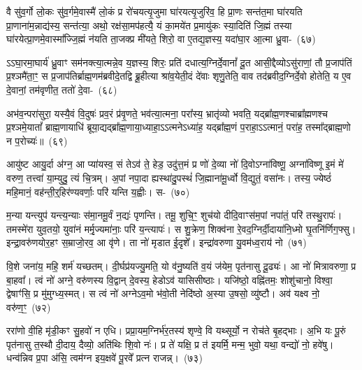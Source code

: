 वै सु॑व॒र्गो लो॒कः सु॑व॒र्गमे॒वास्मै॑ लो॒कं प्र रो॑चयत्यृ॒जुमा घा॑रयत्यृ॒जुरि॑व॒ हि प्रा॒णः सन्त॑त॒मा घा॑रयति प्रा॒णाना॑म॒न्नाद्य॑स्य॒ सन्त॑त्या॒ अथो॒ रक्ष॑सा॒मप॑हत्यै॒ यं का॒मये॑त प्र॒मायु॑कः स्या॒दिति॑ जि॒ह्मं तस्या घा॑रयेत्प्रा॒णमे॒वास्मा᳚ज्जि॒ह्मं न॑यति ता॒जक्प्र मी॑यते॒ शिरो॒ वा ए॒तद्य॒ज्ञस्य॒ यदा॑घा॒र आ॒त्मा ध्रु॒वा-~(६७)\ip

ऽऽघा॒रमा॒घार्य॑ ध्रु॒वाꣳ सम॑नक्त्या॒त्मन्ने॒व य॒ज्ञस्य॒ शिरः॒ प्रति॑ दधा\-त्य॒\-ग्निर्दे॒वानां᳚ दू॒त आसी॒द्दैव्यो\-ऽसु॑राणां॒ तौ प्र॒जा\-प॑तिं प्र॒श्ञमै॑ता॒ꣳ॒ स प्र॒जा\-प॑तिर्ब्राह्म॒णम॑ब्रवीदे॒तद्वि ब्रू॒हीत्या श्रा॑व॒येती॒दं दे॑वाः शृणु॒तेति॒ वाव तद॑ब्रवीद॒ग्निर्दे॒वो होतेति॒ य ए॒व दे॒वानां॒ तम॑वृणीत॒ ततो॑ \mbox{दे॒वा-~(६८)\ip}

अभ॑व॒न्परा॑सुरा॒ यस्यै॒वं वि॒दुषः॑ प्रव॒रं प्र॑वृ॒णते॒ भव॑त्या॒त्मना॒ परा᳚स्य॒ भ्रातृ॑व्यो भवति॒ यद्ब्रा᳚ह्म॒णश्चाब्रा᳚ह्मणश्च प्र॒श्ञमे॒यातां᳚ ब्राह्म॒णायाधि॑ ब्रूया॒द्यद्ब्रा᳚ह्म॒णाया॒ध्याहा॒\-ऽऽ\-त्मने\-ऽध्या॑ह॒ यद्ब्रा᳚ह्म॒णं प॒राहा॒\-ऽऽ\-त्मानं॒ परा॑ह॒ तस्मा᳚द्\-ब्राह्म॒णो न प॒रोच्यः॑॥~(६९)\ip

{\anuvakamend[{वा आ॑र॒ण्याꣴश्चाव॑ रु॒न्धे\-ऽथो॑ प॒शुभिः॒ सो᳚\-ऽब्रवीद्दक्षिणा॒र्ध्य॑न्त्रय॑ इव ध्रु॒वा दे॒वाश्च॑त्वारि॒ꣳ॒शच्च॑}]}%

आयु॑ष्ट आयु॒र्दा अ॑ग्न॒ आ प्या॑यस्व॒ सं ते\-ऽव॑ ते॒ हेड॒ उदु॑त्त॒मं प्र णो॑ दे॒व्या नो॑ दि॒वो\-ऽग्ना॑विष्णू॒ अग्ना॑विष्णू इ॒मं मे॑ वरुण॒ तत्त्वा॑ या॒म्युदु॒ त्यं चि॒त्रम्। अ॒पां नपा॒दा ह्यस्था॑दु॒पस्थं॑ जि॒ह्माना॑मू॒र्ध्वो वि॒द्युतं॒ वसा॑नः। तस्य॒ ज्येष्ठं॑ महि॒मानं॒ वह॑न्ती॒र्॒\mbox{}हिर॑ण्यवर्णाः॒ परि॑ यन्ति य॒ह्वीः। स-~(७०)\ip

म॒न्या यन्त्युप॑ यन्त्य॒न्याः स॑मा॒नमू॒र्वं न॒द्यः॑ पृणन्ति। तमू॒ शुचि॒ꣳ॒ शुच॑यो दीदि॒वाꣳस॑म॒पां नपा॑तं॒ परि॑ तस्थु॒रापः॑। तमस्मे॑रा युव॒तयो॒ युवा॑नं मर्मृ॒ज्यमा॑नाः॒ परि॑ य॒न्त्यापः॑। स शु॒क्रेण॒ शिक्व॑ना रे॒वद॒ग्निर्दी॒दाया॑नि॒ध्मो घृ॒तनि॑र्णिग॒फ्सु। इन्द्रा॒वरु॑णयोर॒हꣳ स॒म्राजो॒रव॒ आ वृ॑णे। ता नो॑ मृडात ई॒दृशे᳚। इन्द्रा॑वरुणा यु॒वम॑ध्व॒राय॑ नो~(७१)\ip

वि॒शे जना॑य॒ महि॒ शर्म॑ यच्छतम्। दी॒र्घप्र॑यज्यु॒मति॒ यो व॑नु॒ष्यति॑ व॒यं ज॑येम॒ पृत॑नासु दू॒ढ्यः॑। आ नो॑ मित्रावरुणा॒ प्र बा॒हवा᳚। त्वं नो॑ अग्ने॒ वरु॑णस्य वि॒द्वान् दे॒वस्य॒ हेडो\-ऽव॑ यासिसीष्ठाः। यजि॑ष्ठो॒ वह्नि॑तमः॒ शोशु॑चानो॒ विश्वा॒ द्वेषाꣳ॑सि॒ प्र मु॑मुग्ध्य॒स्मत्। स त्वं नो॑ अग्ने\-ऽव॒मो भ॑वो॒ती नेदि॑ष्ठो अ॒स्या उ॒षसो॒ व्यु॑ष्टौ। अव॑ यक्ष्व नो॒ वरु॑ण॒ꣳ॒~(७२)\ip

ररा॑णो वी॒हि मृ॑डी॒कꣳ सु॒हवो॑ न एधि। प्रप्रा॒यम॒ग्निर्भ॑र॒तस्य॑ शृण्वे॒ वि यथ्सूर्यो॒ न रोच॑ते बृ॒हद्भाः। अ॒भि यः पू॒रुं पृत॑नासु त॒स्थौ दी॒दाय॒ दैव्यो॒ अति॑थिः शि॒वो नः॑। प्र ते॑ यक्षि॒ प्र त॑ इयर्मि॒ मन्म॒ भुवो॒ यथा॒ वन्द्यो॑ नो॒ हवे॑षु। धन्व॑न्निव प्र॒पा अ॑सि॒ त्वम॑ग्न इय॒क्षवे॑ पू॒रवे᳚ प्रत्न राजन्न्।~(७३)\ip


